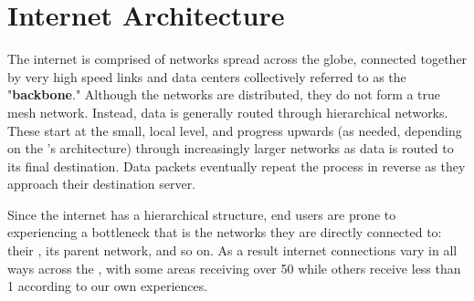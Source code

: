 \section{Internet Architecture}\label{sec:background_internet_architecture}

The internet is comprised of networks spread across the globe, connected together by very high speed links and data centers collectively referred to as the "\textbf{backbone}." Although the networks are distributed, they do not form a true mesh network. Instead, data is generally routed through hierarchical networks. These start at the small, local level, and progress upwards (as needed, depending on the \isp's architecture) through increasingly larger networks as data is routed to its final destination. Data packets eventually repeat the process in reverse as they approach their destination server.

Since the internet has a hierarchical structure, end users are prone to experiencing a bottleneck that is the networks they are directly connected to: their \isp, its parent network, and so on. As a result internet connections vary in all ways across the \us, with some areas receiving over 50 \mbps while others receive less than 1 according to our own experiences.